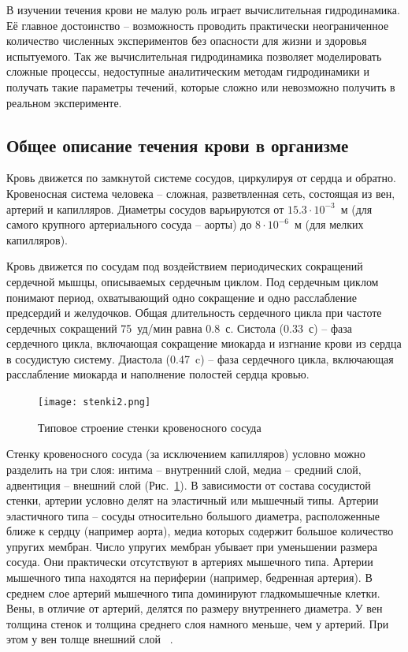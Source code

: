 В изучении течения крови не малую роль играет вычислительная гидродинамика. Её главное достоинство -- возможность проводить практически 
неограниченное количество численных экспериментов без опасности для жизни и здоровья испытуемого. Так же вычислительная гидродинамика 
позволяет моделировать сложные процессы, недоступные аналитическим методам гидродинамики и получать такие параметры течений, которые 
сложно или невозможно получить в реальном эксперименте.

\subsection{Общее описание течения крови в организме}
Кровь движется по замкнутой системе сосудов, циркулируя от сердца и обратно. Кровеносная система человека -- сложная, разветвленная сеть,
состоящая из вен, артерий и капилляров.
Диаметры сосудов варьируются от \texttilde$15.3\cdot 10^{-3}$~м (для самого крупного артериального сосуда -- аорты)
до \texttilde$8\cdot 10^{-6}$~м (для мелких капилляров).

Кровь движется по сосудам под воздействием периодических сокращений сердечной мышцы, описываемых сердечным циклом. 
Под сердечным циклом понимают период, охватывающий одно сокращение и одно расслабление предсердий и желудочков. 
Общая длительность сердечного цикла при частоте сердечных сокращений 75~уд/мин равна 0.8~с. Систола (0.33~с) -- фаза сердечного цикла, 
включающая сокращение миокарда и изгнание крови из сердца в сосудистую систему. Диастола (0.47~c) -- фаза сердечного цикла, 
включающая расслабление миокарда и наполнение полостей сердца кровью.

\begin{figure}[h!]
    \centering
    \texttt{[image: stenki2.png]}
    \caption{Типовое строение стенки кровеносного сосуда ~\cite{blausen:2014}}
    \label{tip}
    \end{figure}

Стенку кровеносного сосуда (за исключением капилляров) условно можно разделить на три слоя: интима -- внутренний слой, 
медиа -- средний слой, адвентиция -- внешний слой (Рис.~\ref{tip}).
В зависимости от состава сосудистой стенки, артерии условно делят на эластичный или мышечный типы. 
Артерии эластичного типа -- сосуды относительно большого диаметра, расположенные ближе к сердцу (например аорта), 
медиа которых содержит большое количество упругих мембран. Число упругих мембран убывает при уменьшении размера сосуда. 
Они практически отсутствуют в артериях мышечного типа. Артерии мышечного типа находятся на периферии (например, бедренная артерия). 
В среднем слое артерий мышечного типа доминируют гладкомышечные клетки. Вены, в отличие от артерий, делятся по размеру внутреннего 
диаметра. У вен толщина стенок и толщина среднего слоя намного меньше, чем у артерий. При этом у вен толще внешний слой ~\cite{Rhodin:1980}. 

